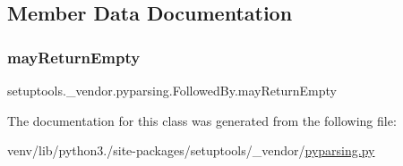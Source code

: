 \subsection{Member Data Documentation}
\mbox{\label{classsetuptools_1_1__vendor_1_1pyparsing_1_1FollowedBy_a534e99b8b37694468a8cca1f4572d589}} 
\subsubsection{\texorpdfstring{may\+Return\+Empty}{mayReturnEmpty}}
{\footnotesize\ttfamily setuptools.\+\_\+vendor.\+pyparsing.\+Followed\+By.\+may\+Return\+Empty}



The documentation for this class was generated from the following file\+:\begin{DoxyCompactItemize}
\item 
venv/lib/python3./site-\/packages/setuptools/\+\_\+vendor/\hyperlink{setuptools_2__vendor_2pyparsing_8py}{pyparsing.\+py}\end{DoxyCompactItemize}
